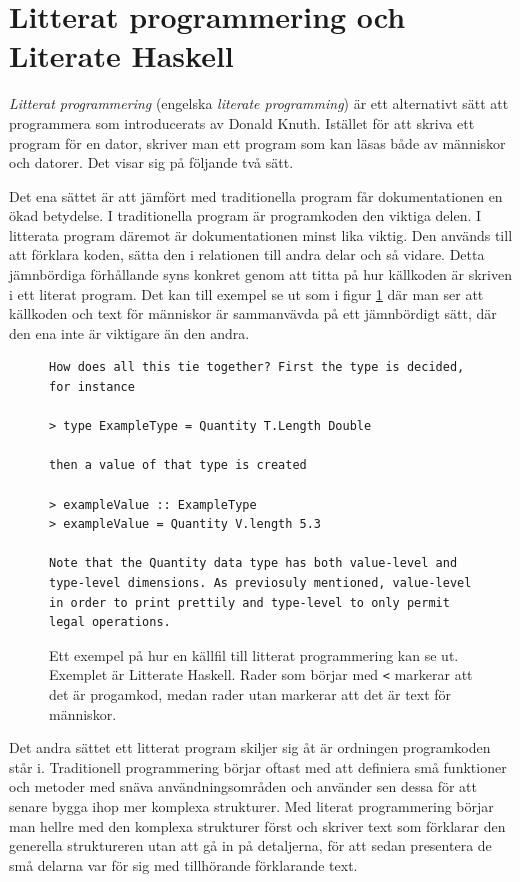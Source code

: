\section{Litterat programmering och Literate Haskell}
\label{sec:lhs}
\begin{draft}
\textit{Litterat programmering} (engelska \textit{literate programming}) är ett
alternativt sätt att programmera som introducerats av Donald Knuth.\cite{knuth}
Istället för att skriva ett program för en dator, skriver man ett program som
kan läsas både av människor och datorer. Det visar sig på följande två sätt.

Det ena sättet är att jämfört med traditionella program får dokumentationen en
ökad betydelse. I traditionella program är programkoden den viktiga delen. I
litterata program däremot är dokumentationen minst lika viktig. Den används till
att förklara koden, sätta den i relationen till andra delar och så vidare.
Detta jämnbördiga förhållande syns konkret genom att titta på hur källkoden är
skriven i ett literat program. Det kan till exempel se ut som i figur
\ref{fig:litterate_haskell_exempel} där man ser att källkoden och text för
människor är sammanvävda på ett jämnbördigt sätt, där den ena inte är viktigare
än den andra.

\begin{figure}[tph]
  \begin{lstlisting}[language={}]
How does all this tie together? First the type is decided, for instance

> type ExampleType = Quantity T.Length Double

then a value of that type is created

> exampleValue :: ExampleType
> exampleValue = Quantity V.length 5.3

Note that the Quantity data type has both value-level and type-level dimensions. As previosuly mentioned, value-level in order to print prettily and type-level to only permit legal operations.
  \end{lstlisting}
  \caption{Ett exempel på hur en källfil till litterat programmering kan se ut. Exemplet är Litterate Haskell. Rader som börjar med \texttt{<} markerar att det är progamkod, medan rader utan markerar att det är text för människor.}
  \label{fig:litterate_haskell_exempel}
\end{figure}

Det andra sättet ett litterat program skiljer sig åt är ordningen programkoden
står i. Traditionell programmering börjar oftast med att definiera små funktioner
och metoder med snäva användningsområden och använder sen dessa för att senare
bygga ihop mer komplexa strukturer. Med literat programmering börjar man hellre
med den komplexa strukturer först och skriver text som förklarar den generella
struktureren utan att gå in på detaljerna, för att sedan presentera de små
delarna var för sig med tillhörande förklarande text.


\end{draft}
